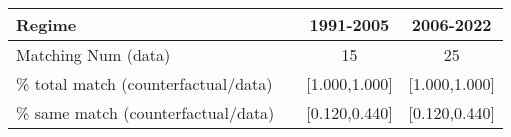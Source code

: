 
\begin{tabular}[t]{lccc}
\toprule
Regime &  & 1991-2005 & 2006-2022\\
\midrule
Matching Num (data) &  & 15 & 25\\
\% total match (counterfactual/data) &  & {}[1.000,1.000] & {}[1.000,1.000]\\
\% same match (counterfactual/data) &  & {}[0.120,0.440] & {}[0.120,0.440]\\
\bottomrule
\end{tabular}
